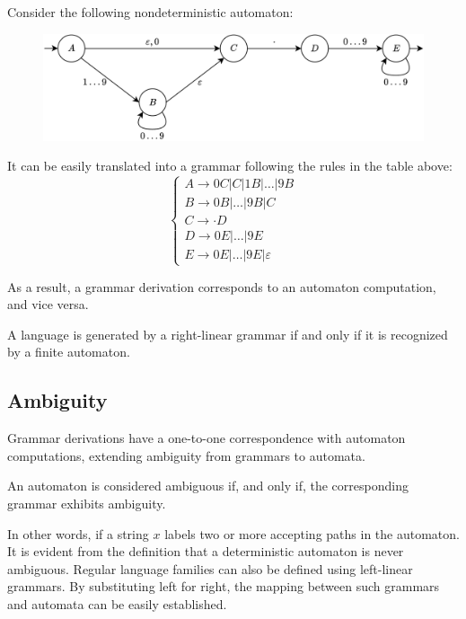 \begin{example}
    Consider the following nondeterministic automaton:
    \begin{figure}[H]
        \centering
        \includegraphics[width=0.75\linewidth]{images/nfsa.png}
    \end{figure}
    It can be easily translated into a grammar following the rules in the table above:
    \[\begin{cases}
        A \rightarrow 0C|C|1B|\dots|9B \\
        B \rightarrow 0B|\dots|9B|C \\
        C \rightarrow \cdot D \\
        D \rightarrow 0E|\dots|9E \\
        E \rightarrow 0E|\dots|9E|\varepsilon
    \end{cases}\]
\end{example}
As a result, a grammar derivation corresponds to an automaton computation, and vice versa.
\begin{proposition}
    A language is generated by a right-linear grammar if and only if it is recognized by a finite automaton.
\end{proposition}

\subsection{Ambiguity}
Grammar derivations have a one-to-one correspondence with automaton computations, extending ambiguity from grammars to automata.
\begin{definition}
    An automaton is considered ambiguous if, and only if, the corresponding grammar exhibits ambiguity. 
\end{definition}
In other words, if a string $x$ labels two or more accepting paths in the automaton.
It is evident from the definition that a deterministic automaton is never ambiguous. 
Regular language families can also be defined using left-linear grammars. 
By substituting left for right, the mapping between such grammars and automata can be easily established.
